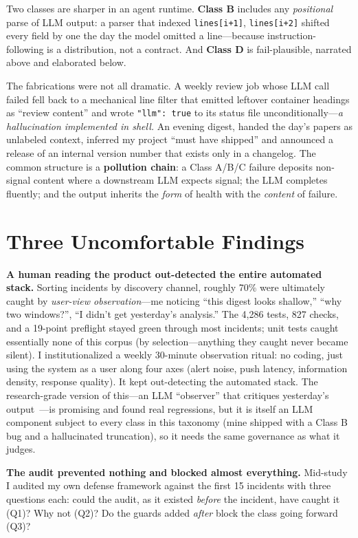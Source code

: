 \documentclass[10pt,journal]{IEEEtran}
\begin{document}
Two classes are sharper in an agent runtime. \textbf{Class B} includes any
\emph{positional} parse of LLM output: a parser that indexed
\texttt{lines[i+1]}, \texttt{lines[i+2]} shifted every field by one the day the
model omitted a line---because instruction-following is a distribution, not a
contract. And \textbf{Class D} is fail-plausible, narrated above and
elaborated below.

The fabrications were not all dramatic. A weekly review job whose LLM call
failed fell back to a mechanical line filter that emitted leftover container
headings as ``review content'' and wrote \texttt{"llm": true} to its status
file unconditionally---\emph{a hallucination implemented in shell.} An evening
digest, handed the day's papers as unlabeled context, inferred my project
``must have shipped'' and announced a release of an internal version number
that exists only in a changelog. The common structure is a \textbf{pollution
chain}: a Class A/B/C failure deposits non-signal content where a downstream
LLM expects signal; the LLM completes fluently; and the output inherits the
\emph{form} of health with the \emph{content} of failure.

\section{Three Uncomfortable Findings}
\textbf{A human reading the product out-detected the entire automated stack.}
Sorting incidents by discovery channel, roughly 70\% were ultimately caught by
\emph{user-view observation}---me noticing ``this digest looks shallow,'' ``why
two windows?'', ``I didn't get yesterday's analysis.'' The 4{,}286 tests, 827
checks, and a 19-point preflight stayed green through most incidents; unit
tests caught essentially none of this corpus (by selection---anything they
caught never became silent). I institutionalized a weekly 30-minute observation
ritual: no coding, just using the system as a user along four axes (alert
noise, push latency, information density, response quality). It kept
out-detecting the automated stack. The research-grade version of this---an LLM
``observer'' that critiques yesterday's output~\cite{ref9}---is promising and
found real regressions, but it is itself an LLM component subject to every
class in this taxonomy (mine shipped with a Class B bug and a hallucinated
truncation), so it needs the same governance as what it judges.

\textbf{The audit prevented nothing and blocked almost everything.} Mid-study I
audited my own defense framework against the first 15 incidents with three
questions each: could the audit, as it existed \emph{before} the incident, have
caught it (Q1)? Why not (Q2)? Do the guards added \emph{after} block the class
going forward (Q3)?
\end{document}
